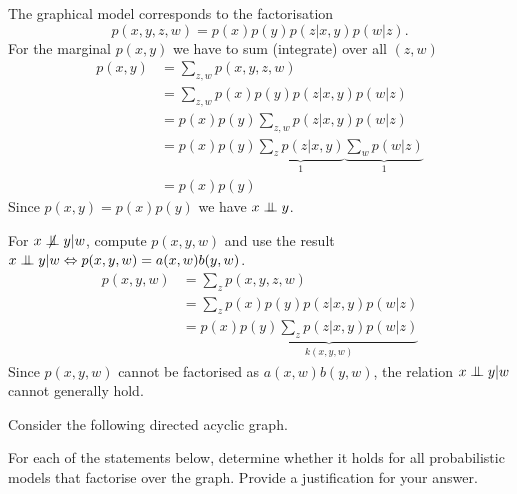 \begin{exenumerate}
  \begin{solution}
    The graphical model corresponds to the factorisation $$p(x,y,z,w) = p(x) p(y) p(z|x,y) p(w|z).$$
    For the marginal $p(x,y)$ we have to sum (integrate) over all $(z,w)$
    \begin{align}
      p(x,y) &= \sum_{z,w} p(x,y,z,w) \\
      & = \sum_{z,w} p(x) p(y) p(z|x,y) p(w|z)\\
      & = p(x) p(y) \sum_{z,w} p(z| x,y) p(w|z)\\
      & = p(x) p(y) \underbrace{\sum_{z} p(z| x,y)}_{1} \underbrace{\sum_{w} p(w|z)}_{1}\\
      & = p(x) p(y)
    \end{align}
    Since $p(x,y) = p(x) p(y)$ we have $x \mathrel{\perp\mspace{-10mu}\perp} y$.

    For $x \notind y | w$, compute $p(x,y,w)$ and use the result $x \mathrel{\perp\mspace{-10mu}\perp} y |w \Leftrightarrow p(x,y,w) = a(x,w)b(y,w)$.
    \begin{align}
      p(x,y,w) & = \sum_z p(x,y,z,w)\\
      & = \sum_z p(x) p(y) p(z|x,y) p(w|z) \\
      & = p(x) \underbrace{p(y) \sum_z p(z|x,y) p(w|z)}_{k(x,y,w)}
    \end{align}
    Since $p(x,y,w)$ cannot be factorised as $a(x,w) b(y,w)$, the relation $x \mathrel{\perp\mspace{-10mu}\perp} y | w$ cannot generally hold.
  \end{solution}

\end{exenumerate}



Consider the following directed acyclic graph.
       \begin{center}
       \end{center}
   For each of the statements below, determine whether it holds for
   all probabilistic models that factorise over the graph. Provide a
   justification for your answer.
   
